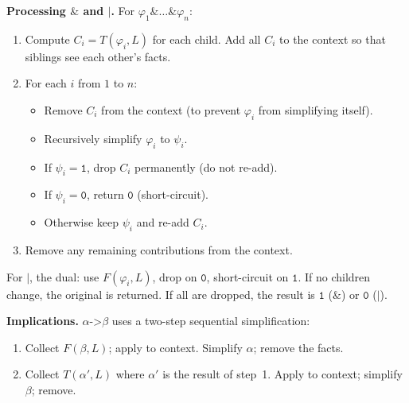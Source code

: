 \documentclass[a4paper,twoside,10pt,DIV=12]{scrreprt}
\newcommand{\IMPLIES}{\mathbin{\texttt{->}}}
\newcommand{\OR}{\mathbin{\texttt{|}}}
\newcommand{\AND}{\mathbin{\texttt{\&}}}
\newcommand{\0}{\texttt{0}}
\newcommand{\1}{\texttt{1}}
\begin{document}
\medskip\noindent
\textbf{Processing $\AND$ and $\OR$.}
For $\varphi_1\AND\dots\AND\varphi_n$:
\begin{enumerate}
  \item Compute $C_i = T(\varphi_i,L)$ for each child.  Add all $C_i$
    to the context so that siblings see each other's facts.
  \item For each $i$ from $1$ to $n$:
    \begin{itemize}
      \item Remove $C_i$ from the context (to prevent $\varphi_i$
        from simplifying itself).
      \item Recursively simplify $\varphi_i$ to $\psi_i$.
      \item If $\psi_i=\1$, drop $C_i$ permanently (do not re-add).
      \item If $\psi_i=\0$, return $\0$ (short-circuit).
      \item Otherwise keep $\psi_i$ and re-add $C_i$.
    \end{itemize}
  \item Remove any remaining contributions from the context.
\end{enumerate}
For $\OR$, the dual: use $F(\varphi_i,L)$, drop on $\0$, short-circuit
on $\1$.  If no children change, the original is returned.  If all are
dropped, the result is $\1$ ($\AND$) or $\0$ ($\OR$).

\medskip\noindent
\textbf{Implications.}
$\alpha\IMPLIES\beta$ uses a two-step sequential simplification:
\begin{enumerate}
  \item Collect $F(\beta,L)$; apply to context.  Simplify $\alpha$;
    remove the facts.
  \item Collect $T(\alpha',L)$ where $\alpha'$ is the result of step~1.
    Apply to context; simplify $\beta$; remove.
\end{enumerate}
\end{document}
